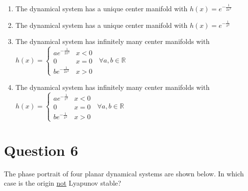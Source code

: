 \documentclass[twoside,10pt,a4paper]{article}
\begin{document}
\begin{enumerate}[label=(\alph*)]
	\item The dynamical system has a unique center manifold with $ \displaystyle h(x) = e^{-\frac{1}{2x^2}} $
	\item The dynamical system has a unique center manifold with $ \displaystyle h(x) = e^{-\frac{1}{x^2}} $
	\item The dynamical system has infinitely many center manifolds with $ \displaystyle h(x) = \begin{cases}
		ae^{-\frac{1}{2x^2}} & x < 0 \\
		0 & x = 0 \\
		be^{-\frac{1}{2x^2}} & x > 0
	\end{cases} \;\; \forall a,b \in \mathbb{R}$
	\item The dynamical system has infinitely many center manifolds with $ \displaystyle h(x) = \begin{cases}
		ae^{-\frac{1}{x^2}} & x < 0 \\
		0 & x = 0 \\
		be^{-\frac{1}{x^2}} & x > 0
	\end{cases} \;\;  \forall a,b \in \mathbb{R}$
\end{enumerate}

\section*{Question 6}
The phase portrait of four planar dynamical systems are shown below. In which case is the origin \underline{not} Lyapunov stable?
\end{document}
